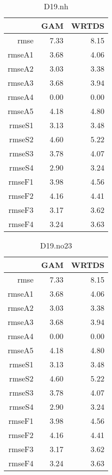 \documentclass[12pt]{amsart}
\begin{document}
\begin{table}[H]
\centering
\begin{tabular}{rrr}
  \hline
 & GAM & WRTDS \\ 
  \hline
rmse & 7.33 & 8.15 \\ 
  rmseA1 & 3.68 & 4.06 \\ 
  rmseA2 & 3.03 & 3.38 \\ 
  rmseA3 & 3.68 & 3.94 \\ 
  rmseA4 & 0.00 & 0.00 \\ 
  rmseA5 & 4.18 & 4.80 \\ 
  rmseS1 & 3.13 & 3.48 \\ 
  rmseS2 & 4.60 & 5.22 \\ 
  rmseS3 & 3.78 & 4.07 \\ 
  rmseS4 & 2.90 & 3.24 \\ 
  rmseF1 & 3.98 & 4.56 \\ 
  rmseF2 & 4.16 & 4.41 \\ 
  rmseF3 & 3.17 & 3.62 \\ 
  rmseF4 & 3.24 & 3.63 \\ 
   \hline
\end{tabular}
\caption{D19.nh}
\end{table}
\begin{table}[H]
\centering
\begin{tabular}{rrr}
  \hline
 & GAM & WRTDS \\ 
  \hline
rmse & 7.33 & 8.15 \\ 
  rmseA1 & 3.68 & 4.06 \\ 
  rmseA2 & 3.03 & 3.38 \\ 
  rmseA3 & 3.68 & 3.94 \\ 
  rmseA4 & 0.00 & 0.00 \\ 
  rmseA5 & 4.18 & 4.80 \\ 
  rmseS1 & 3.13 & 3.48 \\ 
  rmseS2 & 4.60 & 5.22 \\ 
  rmseS3 & 3.78 & 4.07 \\ 
  rmseS4 & 2.90 & 3.24 \\ 
  rmseF1 & 3.98 & 4.56 \\ 
  rmseF2 & 4.16 & 4.41 \\ 
  rmseF3 & 3.17 & 3.62 \\ 
  rmseF4 & 3.24 & 3.63 \\ 
   \hline
\end{tabular}
\caption{D19.no23}
\end{table}
\end{document}
